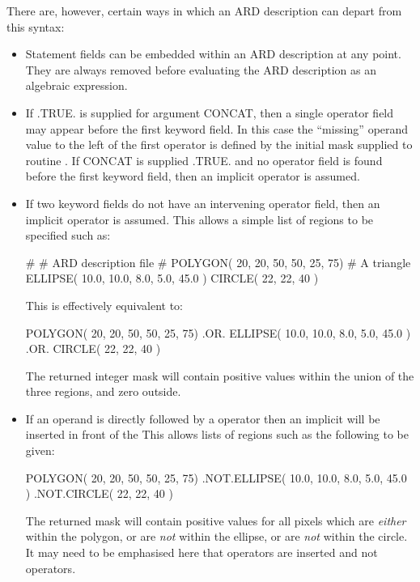 \documentclass[11pt,nolof]{starlink}
\begin{document}
There are, however, certain ways in which an ARD description can depart from
this syntax:

\begin{itemize}

\item Statement fields can be embedded within an ARD description at any point.
They are always removed before evaluating the ARD description as an algebraic
expression.

\item If .TRUE. is supplied for  argument CONCAT, then a single
operator field may appear before the first keyword field. In this case the
``missing'' operand value to the left of the first operator is defined by the
initial mask supplied to routine . If CONCAT is supplied .TRUE. and no
operator field is found before the first keyword field, then an implicit 
operator is assumed.

\item If two keyword fields do not have an intervening operator field, then an
implicit  operator is assumed. This allows a simple list of regions to
be specified such as:

\small
\begin{terminalv}
   #
   #  ARD description file
   #
   POLYGON( 20, 20, 50, 50, 25, 75)      # A triangle
   ELLIPSE( 10.0, 10.0, 8.0, 5.0, 45.0 )
   CIRCLE( 22, 22, 40 )
\end{terminalv}
\normalsize

This is effectively equivalent to:

\small
\begin{terminalv}
   POLYGON( 20, 20, 50, 50, 25, 75) .OR.
   ELLIPSE( 10.0, 10.0, 8.0, 5.0, 45.0 ) .OR.
   CIRCLE( 22, 22, 40 )
\end{terminalv}
\normalsize

The returned integer mask will contain positive values within the union of the
three regions, and zero outside.

\item If an operand is directly followed by a  operator then an implicit
 will be inserted in front of the  This allows lists of regions such
as the following to be given:

\small
\begin{terminalv}
   POLYGON( 20, 20, 50, 50, 25, 75)
   .NOT.ELLIPSE( 10.0, 10.0, 8.0, 5.0, 45.0 )
   .NOT.CIRCLE( 22, 22, 40 )
\end{terminalv}
\normalsize

The returned mask will contain positive values for all pixels which are
\emph{either} within the polygon, or are \emph{not} within the ellipse, or are
\emph{not} within the circle. It may need to be emphasised here that  operators
are inserted and not  operators.

\end{itemize}
\end{document}
